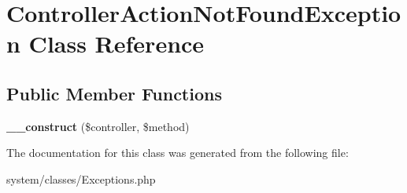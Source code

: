 \hypertarget{class_controller_action_not_found_exception}{
\section{ControllerActionNotFoundException Class Reference}
\label{class_controller_action_not_found_exception}
}
\subsection*{Public Member Functions}
\begin{DoxyCompactItemize}
\item 
\hypertarget{class_controller_action_not_found_exception_ae23f8dc3c4cd9ed62f69b24e0cabddd3}{
{\bfseries \_\-\_\-construct} (\$controller, \$method)}
\label{class_controller_action_not_found_exception_ae23f8dc3c4cd9ed62f69b24e0cabddd3}

\end{DoxyCompactItemize}


The documentation for this class was generated from the following file:\begin{DoxyCompactItemize}
\item 
system/classes/Exceptions.php\end{DoxyCompactItemize}
